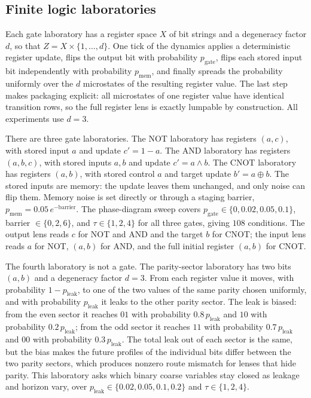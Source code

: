 \subsection{Finite logic laboratories}

Each gate laboratory has a register space \(X\) of bit strings and a degeneracy factor \(d\), so that \(Z = X \times \{1,\dots,d\}\). One tick of the dynamics applies a deterministic register update, flips the output bit with probability \(p_{\mathrm{gate}}\), flips each stored input bit independently with probability \(p_{\mathrm{mem}}\), and finally spreads the probability uniformly over the \(d\) microstates of the resulting register value. The last step makes packaging explicit: all microstates of one register value have identical transition rows, so the full register lens is exactly lumpable by construction. All experiments use \(d=3\).

There are three gate laboratories. The NOT laboratory has registers \((a,c)\), with stored input \(a\) and update \(c' = 1-a\). The AND laboratory has registers \((a,b,c)\), with stored inputs \(a,b\) and update \(c' = a \wedge b\). The CNOT laboratory has registers \((a,b)\), with stored control \(a\) and target update \(b' = a \oplus b\). The stored inputs are memory: the update leaves them unchanged, and only noise can flip them. Memory noise is set directly or through a staging barrier, \(p_{\mathrm{mem}} = 0.05\,e^{-\mathrm{barrier}}\). The phase-diagram sweep covers \(p_{\mathrm{gate}}\in\{0,0.02,0.05,0.1\}\), barrier \(\in\{0,2,6\}\), and \(\tau\in\{1,2,4\}\) for all three gates, giving \(108\) conditions. The output lens reads \(c\) for NOT and AND and the target \(b\) for CNOT; the input lens reads \(a\) for NOT, \((a,b)\) for AND, and the full initial register \((a,b)\) for CNOT.

The fourth laboratory is not a gate. The parity-sector laboratory has two bits \((a,b)\) and a degeneracy factor \(d=3\). From each register value it moves, with probability \(1-p_{\mathrm{leak}}\), to one of the two values of the same parity chosen uniformly, and with probability \(p_{\mathrm{leak}}\) it leaks to the other parity sector. The leak is biased: from the even sector it reaches \(01\) with probability \(0.8\,p_{\mathrm{leak}}\) and \(10\) with probability \(0.2\,p_{\mathrm{leak}}\); from the odd sector it reaches \(11\) with probability \(0.7\,p_{\mathrm{leak}}\) and \(00\) with probability \(0.3\,p_{\mathrm{leak}}\). The total leak out of each sector is the same, but the bias makes the future profiles of the individual bits differ between the two parity sectors, which produces nonzero route mismatch for lenses that hide parity. This laboratory asks which binary coarse variables stay closed as leakage and horizon vary, over \(p_{\mathrm{leak}}\in\{0.02,0.05,0.1,0.2\}\) and \(\tau\in\{1,2,4\}\).

